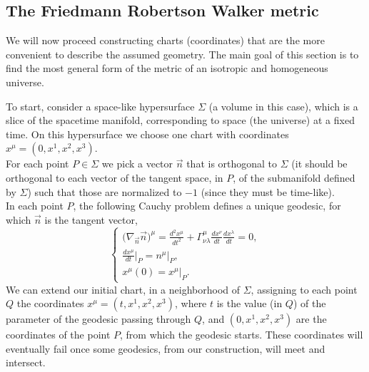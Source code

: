 \subsection{The Friedmann Robertson Walker metric}
We will now proceed constructing charts (coordinates) that are the more convenient to describe the assumed geometry. The main goal of this section is to find the most general form of the metric of an isotropic and homogeneous universe.

To start, consider a space-like hypersurface $\Sigma$ (a volume in this case), which is a slice of the spacetime manifold, corresponding to space (the universe) at a fixed time. On this hypersurface we choose one chart with coordinates $x^\mu=(0,x^1,x^2,x^3)$.\\ For each point $P\in\Sigma$ we pick a vector $\vec n$ that is orthogonal to $\Sigma$ (it should be orthogonal to each vector of the tangent space, in $P$, of the submanifold defined by $\Sigma$) such that those are normalized to $-1$ (since they must be time-like).\\ In each point $P$, the following Cauchy problem defines a unique geodesic, for which $\vec n$ is the tangent vector,
\begin{equation}\label{Chaucy problem}
    \begin{cases}
        \big(\nabla_{\vec n}\vec n\big)^\mu=\frac{d^2x^\mu}{dt^2}+\Gamma_{\nu\lambda}^{\mu}\frac{dx^\nu}{dt}\frac{dx^\lambda}{dt}=0,\\\frac{dx^\mu}{dt}\big|_{P}=n^\mu\big|_P,\\x^\mu(0)=x^\mu\big|_P.
    \end{cases}
\end{equation}
We can extend our initial chart, in a neighborhood of $\Sigma$, assigning to each point $Q$ the coordinates $x^\mu=(t,x^1,x^2,x^3)$, where $t$ is the value (in $Q$) of the parameter of the geodesic passing through $Q$, and $(0,x^1,x^2,x^3)$ are the coordinates of the point $P$, from which the geodesic starts. These coordinates will eventually fail once some geodesics, from our construction, will meet and intersect.

